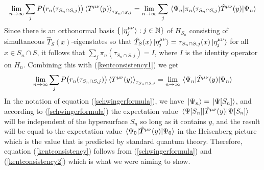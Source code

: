 \begin{equation}\label{kentconsistency1}
\lim_{n\rightarrow\infty}\sum_jP\big(r_n(\tau_{S_n\cap S, j})\big)\ev*{T^{\mu\nu}(y)}_{\tau_{S_n\cap S, j}}=\lim_{n\rightarrow\infty}\sum_{j}{\ev*{\pi_{n}(\tau_{S_n\cap S, j})\hat{T}^{\mu\nu}(y)}{\Psi_n}}
\end{equation}
Since there is an orthonormal basis $\{\ket*{\eta_j^{\mu\nu}}:j\in\mathbb{N}\}$ of $H_{S_n}$ consisting of simultaneous $\hat{T}_S(x)$-eigenstates so that $\hat{T}_S(x)\ket*{\eta_j^{\mu\nu}}=\tau_{S_n\cap S, j}(x)\ket*{\eta_j^{\mu\nu}}$ for all $x\in S_n\cap S$, it follows that $\sum_j \pi_{n}(\tau_{S_n\cap S, j})=I$, where $I$ is the identity operator on $H_n$. Combining this with (\ref{kentconsistency1}) we get
\begin{equation}\label{kentconsistency2}
	\lim_{n\rightarrow\infty}\sum_jP\big(r_n(\tau_{S_n\cap S, j})\big)\ev*{T^{\mu\nu}(y)}_{\tau_{S_n\cap S, j}}=\lim_{n\rightarrow\infty}\ev*{\hat{T}^{\mu\nu}(y)}{\Psi_n}
	\end{equation}
In the notation of equation (\ref{schwingerformula}), we have $\ket*{\Psi_n}=\ket*{\Psi[S_n]}$, %
%
and according to (\ref{schwingerformula}) the expectation value $\ev*{\hat{T}^{\mu\nu}(y)}{\Psi[S_n]}$ will be independent of the hypersurface $S_n$ so long as it contains $y$, and the result will be equal to the expectation value $\ev*{\hat{\bm{T}}^{\mu\nu}(y)}{\Psi_0}$ in the Heisenberg picture which is the value that is predicted by standard quantum theory. Therefore, equation (\ref{kentconsistency}) follows from (\ref{schwingerformula}) and (\ref{kentconsistency2}) which is what we were aiming to show.

